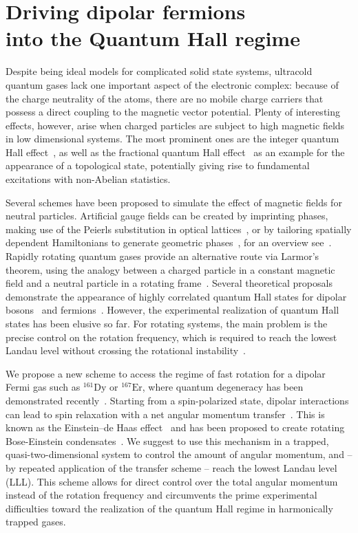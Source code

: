 \chapter[Driving dipolar fermions into the Quantum Hall regime]{Driving dipolar fermions\texorpdfstring{\\}{ }into the Quantum Hall regime}
\label{dipolar_fermions}

Despite being ideal models for complicated solid state systems, ultracold quantum gases lack one important aspect of the electronic complex: because of the charge neutrality of the atoms, there are no mobile charge carriers that possess a direct coupling to the magnetic vector potential. Plenty of interesting effects, however, arise when charged particles are subject to high magnetic fields in low dimensional systems. The most prominent ones are the integer quantum Hall effect~\cite{Klitzing1980}, as well as the fractional quantum Hall effect~\cite{Laughlin1983} as an example for the appearance of a topological state, potentially giving rise to fundamental excitations with non-Abelian statistics.

Several schemes have been proposed to simulate the effect of magnetic fields for neutral particles. Artificial gauge fields can be created by imprinting phases, making use of the Peierls substitution in optical lattices~\cite{Aidelsburger2011,Jimenez-Garcia2012,Struck2012}, or by tailoring spatially dependent Hamiltonians to generate geometric phases~\cite{Lin2009}, for an overview see~\cite{Dalibard2011}. Rapidly rotating quantum gases provide an alternative route via Larmor's theorem, using the analogy between a charged particle in a constant magnetic field and a neutral particle in a rotating frame~\cite{Cooper2008,Fetter2009}. Several theoretical proposals demonstrate the appearance of highly correlated quantum Hall states for dipolar bosons~\cite{Cooper2005} and fermions~\cite{Baranov2005,Osterloh2007}. However, the experimental realization of quantum Hall states has been elusive so far. For rotating systems, the main problem is the precise control on the rotation frequency, which is required to reach the lowest Landau level without crossing the rotational instability~\cite{Schweikhard2004}.

We propose a new scheme to access the regime of fast rotation for a dipolar Fermi gas such as $^{161}\text{Dy}$ or $^{167}\text{Er}$, where quantum degeneracy has been demonstrated recently~\cite{Lu2012,Aikawa2014}. Starting from a spin-polarized state, dipolar interactions can lead to spin relaxation with a net angular momentum transfer~\cite{Hensler2003}. This is known as the Einstein--de Haas effect~\cite{Einstein1915} and has been proposed to create rotating Bose-Einstein condensates~\cite{Santos2006,Kawaguchi2006}. We suggest to use this mechanism in a trapped, quasi-two-dimensional system to control the amount of angular momentum, and -- by repeated application of the transfer scheme -- reach the lowest Landau level (LLL). This scheme allows for direct control over the total angular momentum instead of the rotation frequency and circumvents the prime experimental difficulties toward the realization of the quantum Hall regime in harmonically trapped gases.

